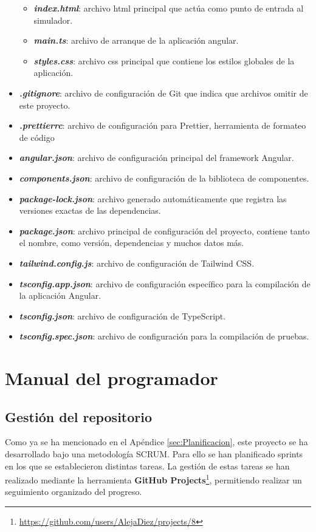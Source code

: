 \begin{itemize}
\begin{itemize}
        \item \textit{\textbf{index.html}}: archivo html principal que actúa como punto de entrada al simulador. 
        \item \textit{\textbf{main.ts}}: archivo de arranque de la aplicación angular.
        \item \textit{\textbf{styles.css}}: archivo css principal que contiene los estilos globales de la aplicación.
    \end{itemize}
    \item \textit{\textbf{.gitignore}}: archivo de configuración de Git que indica que archivos omitir de este proyecto.
    \item \textit{\textbf{.prettierrc}}: archivo de configuración para Prettier, herramienta de formateo de código
    \item \textit{\textbf{angular.json}}: archivo de configuración principal del framework Angular.
    \item \textit{\textbf{components.json}}: archivo de configuración de la biblioteca de componentes.
    \item \textit{\textbf{package-lock.json}}: archivo generado automáticamente que registra las versiones exactas de las dependencias.
    \item \textit{\textbf{package.json}}: archivo principal de configuración del proyecto, contiene tanto el nombre, como versión, dependencias y muchos datos más.
    \item \textit{\textbf{tailwind.config.js}}: archivo de configuración de Tailwind CSS.
    \item \textit{\textbf{tsconfig.app.json}}: archivo de configuración específico para la compilación de la aplicación Angular.
    \item \textit{\textbf{tsconfig.json}}: archivo de configuración de TypeScript.
    \item \textit{\textbf{tsconfig.spec.json}}: archivo de configuración para la compilación de pruebas.
\end{itemize}

\section{Manual del programador}
\label{sec:ManualProgramador}
\subsection{Gestión del repositorio}
\label{subsec:GestionRepositorio}
Como ya se ha mencionado en el Apéndice \ref{sec:Planificacion}, este proyecto se ha desarrollado bajo una metodología SCRUM. Para ello se han planificado sprints en los que se establecieron distintas tareas. La gestión de estas tareas se han realizado mediante la herramienta \textbf{GitHub Projects}\footnote{\url{https://github.com/users/AlejaDiez/projects/8}}, permitiendo realizar un seguimiento organizado del progreso.

